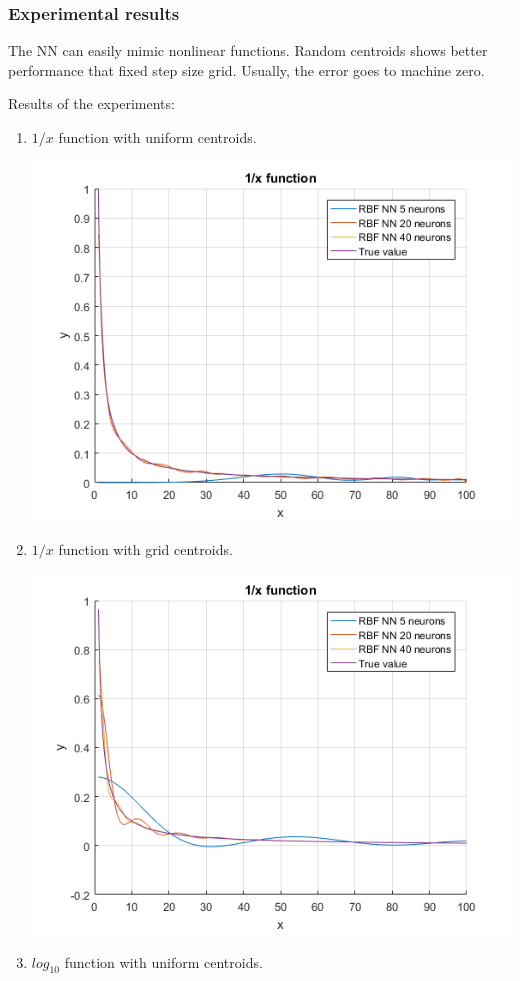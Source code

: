 \documentclass[a4paper, 12pt]{article}
\begin{document}


\subsubsection{Experimental results}

The NN can easily mimic nonlinear functions. Random centroids shows better performance that fixed step size grid. Usually, the error goes to machine zero.

Results of the experiments:
\begin{enumerate}
\newpage
\item $1/x$ function with uniform centroids.

\includegraphics[scale = 0.8]{f11.png}

\item $1/x$ function with grid centroids.

\includegraphics[scale = 0.8]{f1.png}
\newpage
\item $log_{10}$ function with uniform centroids.


\end{enumerate}
\end{document}
